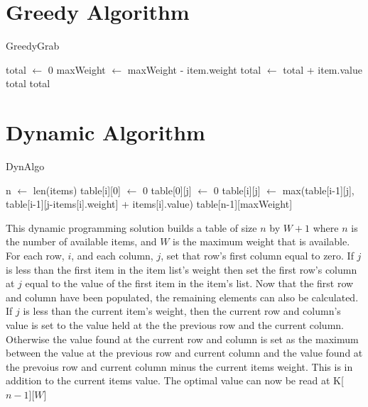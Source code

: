 \documentclass[10pt, letterpaper]{article}
\begin{document}
\section{Greedy Algorithm}

\begin{algorithm}
  \begin{algorithmic}
    \caption{GreedyGrab}\label{GreedyGrab}
    \State total $\gets$ 0
    \State maxWeight $\gets$ maxWeight - item.weight
    \State total $\gets$ total + item.value
    \EndIf
    \Return total
    \EndIf
    \EndFor
    \Return total
    \EndFunction
  \end{algorithmic}
\end{algorithm}


\section{Dynamic Algorithm}
\begin{algorithm}
	\begin{algorithmic}
		\caption{DynAlgo}\label{DynAlgo}
		\State n $\gets$ len(items)
				\State table[i][0] $\gets$ 0
					\State table[0][j] $\gets$ 0
				\EndIf
					\State table[i][j] $\gets$ max(table[i-1][j], table[i-1][j-items[i].weight] + items[i].value)
				\EndIf
			\EndFor
		\EndFor
		\Return table[n-1][maxWeight]
		\EndFunction
	\end{algorithmic}
\end{algorithm}

This dynamic programming solution builds a table of size $n$ by $W+1$ where $n$ is the number of available items, and $W$ is the maximum weight that is available. For each row, $i$, and each column, $j$,  set that row's first column equal to zero. If $j$ is less than the first item in the item list's weight then set the first row's column at $j$ equal to the value of the first item in the item's list.
Now that the first row and column have been populated, the remaining elements can also be calculated.
If $j$ is less than the current item's weight, then the current row and column's value is set to the value held at the the previous row and the current column. Otherwise the value found at the current row and column is set as the maximum between the value at the previous row and current column and the value found at the prevoius row and current column minus the current items weight. This is in addition to the current items value. The optimal value can now be read at K[$n-1$][$W$]
\end{document}
